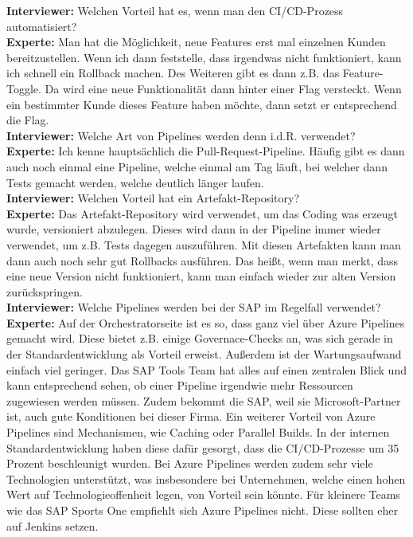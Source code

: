 \begin{linenumbers}
    \textbf{Interviewer:} Welchen Vorteil hat es, wenn man den CI/CD-Prozess automatisiert?\\
    \textbf{Experte:} Man hat die Möglichkeit, neue Features erst mal einzelnen Kunden bereitzustellen. Wenn ich dann feststelle, dass irgendwas nicht funktioniert, kann ich schnell ein Rollback machen. Des Weiteren gibt es dann z.B. das Feature-Toggle. Da wird eine neue Funktionalität dann hinter einer Flag versteckt. Wenn ein bestimmter Kunde dieses Feature haben möchte, dann setzt er entsprechend die Flag.\\
    \textbf{Interviewer:} Welche Art von Pipelines werden denn i.d.R. verwendet?\\
    \textbf{Experte:} Ich kenne hauptsächlich die Pull-Request-Pipeline. Häufig gibt es dann auch noch einmal eine Pipeline, welche einmal am Tag läuft, bei welcher dann Tests gemacht werden, welche deutlich länger laufen.\\
    \textbf{Interviewer:} Welchen Vorteil hat ein Artefakt-Repository?\\
    \textbf{Experte:} Das Artefakt-Repository wird verwendet, um das Coding was erzeugt wurde, versioniert abzulegen. Dieses wird dann in der Pipeline immer wieder verwendet, um z.B. Tests dagegen auszuführen. Mit diesen Artefakten kann man dann auch noch sehr gut Rollbacks ausführen. Das heißt, wenn man merkt, dass eine neue Version nicht funktioniert, kann man einfach wieder zur alten Version zurückspringen.\\
    \textbf{Interviewer:} Welche Pipelines werden bei der SAP im Regelfall verwendet?\\
    \textbf{Experte:} Auf der Orchestratorseite ist es so, dass ganz viel über Azure Pipelines gemacht wird. Diese bietet z.B. einige Governace-Checks an, was sich gerade in der Standardentwicklung als Vorteil erweist. Außerdem ist der Wartungsaufwand einfach viel geringer. Das SAP Tools Team hat  alles auf einen zentralen Blick und kann entsprechend sehen, ob einer Pipeline irgendwie mehr Ressourcen zugewiesen werden müssen. Zudem bekommt die SAP, weil sie Microsoft-Partner ist, auch gute Konditionen bei dieser Firma. Ein weiterer Vorteil von Azure Pipelines sind Mechanismen, wie Caching oder Parallel Builds. In der internen Standardentwicklung haben diese dafür gesorgt, dass die CI/CD-Prozesse um 35 Prozent beschleunigt wurden. Bei Azure Pipelines werden zudem sehr viele Technologien unterstützt, was insbesondere bei Unternehmen, welche einen hohen Wert auf Technologieoffenheit legen, von Vorteil sein könnte. Für kleinere Teams wie das SAP Sports One empfiehlt sich Azure Pipelines nicht. Diese sollten eher auf Jenkins setzen.\\

\end{linenumbers}
